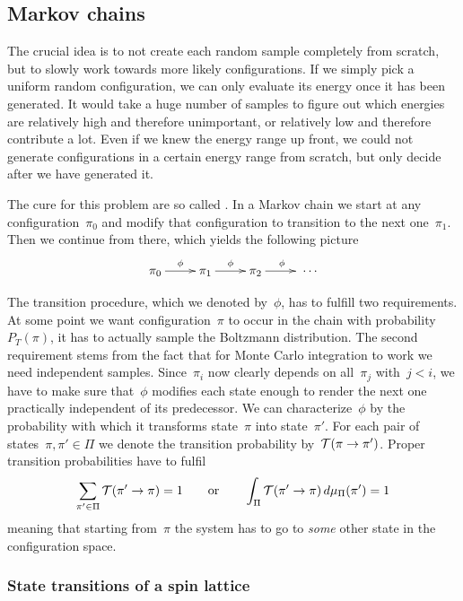 \subsection{Markov chains}

The crucial idea is to not create each random sample completely from scratch,
but to slowly work towards more likely configurations. If we simply pick a
uniform random configuration, we can only evaluate its energy once it has been
generated. It would take a huge number of samples to figure out which energies
are relatively high and therefore unimportant, or relatively low and therefore
contribute a lot. Even if we knew the energy range up front, we could not
generate configurations in a certain energy range from scratch, but only decide
after we have generated it.

The cure for this problem are so called . In a Markov
chain we start at any configuration~$\pi_0$ and modify that configuration to
transition to the next one~$\pi_1$. Then we continue from there, which yields
the following picture
%
\begin{equation}
  \xymatrix{\pi_0 \ar[r]^{\phi} &\pi_1 \ar[r]^{\phi} &\pi_2 \ar[r]^{\phi}
  &\;\cdots}
\end{equation}

The transition procedure, which we denoted by~$\phi$, has to fulfill two
requirements. At some point we want configuration~$\pi$ to occur in the chain
with probability~$P_T(\pi)$, \ie{} it has to actually sample the Boltzmann
distribution. The second requirement stems from the fact that for Monte Carlo
integration to work we need independent samples. Since~$\pi_{i}$
now clearly depends on all~$\pi_j$ with~$j < i$, we have to make sure
that~$\phi$ modifies each state enough to render the next one practically
independent of its predecessor. We can characterize~$\phi$ by the probability
with which it transforms state~$\pi$ into state~$\pi'$. For each pair of
states~$\pi, \pi' \in \Pi$ we denote the transition probability by~$\mathcal{T}(\pi \to
\pi')$. Proper transition probabilities have to fulfil
%
\begin{equation}\label{probprop}
  \sum_{\pi' \in \Pi} \mathcal{T}(\pi' \to \pi) = 1 \qquad\text{or}\qquad
  \int_{\Pi} \mathcal{T}(\pi' \to \pi) \,d\mu_{\Pi}(\pi') = 1
\end{equation}
%
meaning that starting from~$\pi$ the system has to go to \emph{some} other state
in the configuration space.

\subsubsection{State transitions of a spin lattice}


